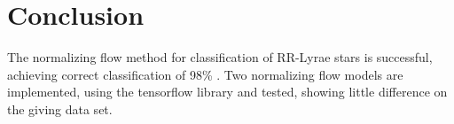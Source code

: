 \documentclass[%
 reprint,
 amsmath,amssymb,
 aps,
]{revtex4-2}
\begin{document}
\section{Conclusion}
The normalizing flow method for classification of RR-Lyrae stars is successful, achieving correct classification of 98\% . Two normalizing flow models are implemented, using the tensorflow library and tested, showing little difference on the giving data set. 



%
%
%
%
%
%
%
\end{document}
